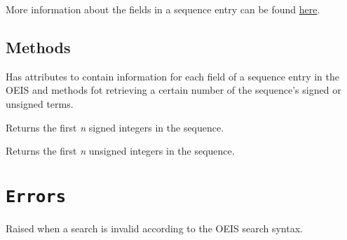 \documentclass[letterpaper,10pt,english]{sphinxmanual}
\begin{document}
More information about the fields in a sequence entry can be found \href{http://oeis.org/eishelp2.html}{here}.


\subsection{Methods}
\label{api:methods}

\begin{fulllineitems}
\label{api:sequence.Sequence}
Has attributes to contain information for each field of a sequence entry
in the OEIS and methods fot retrieving a certain number of the
sequence's signed or unsigned terms.

\begin{fulllineitems}
\label{api:sequence.Sequence.signed}
Returns the first \emph{n} signed integers in the sequence.

\end{fulllineitems}


\begin{fulllineitems}
\label{api:sequence.Sequence.unsigned}
Returns the first \emph{n} unsigned integers in the sequence.

\end{fulllineitems}


\end{fulllineitems}



\section{\texttt{Errors}}
\label{api:module-errors}\label{api:errors}

\begin{fulllineitems}
\label{api:errors.InvalidQueryError}
Raised when a search is invalid according to the OEIS search syntax.

\end{fulllineitems}

\end{document}
